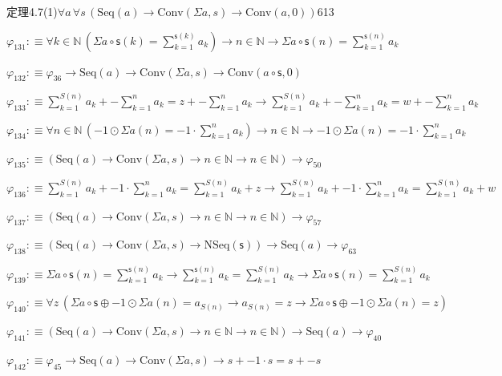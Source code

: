 \begin{fullproof}{定理4.7(1)}{$\forall a\,\forall s\,(\mathrm{Seq}(a) \to \mathrm{Conv}(\Sigma a,s) \to \mathrm{Conv}(a,0))$}{613}
\begin{abbrevlist}
\item $\varphi_{131} :\equiv \forall k \in \mathbb{N}\,(\Sigma a \circ \mathsf{s}(k) = {\textstyle\sum_{k=1}^{\mathsf{s}(k)} a_{k}}) \to n \in \mathbb{N} \to \Sigma a \circ \mathsf{s}(n) = {\textstyle\sum_{k=1}^{\mathsf{s}(n)} a_{k}}$
\item $\varphi_{132} :\equiv \varphi_{36} \to \mathrm{Seq}(a) \to \mathrm{Conv}(\Sigma a,s) \to \mathrm{Conv}(a \circ \mathsf{s},0)$
\item $\varphi_{133} :\equiv {\textstyle\sum_{k=1}^{S(n)} a_{k}} + -{\textstyle\sum_{k=1}^{n} a_{k}} = z + -{\textstyle\sum_{k=1}^{n} a_{k}} \to {\textstyle\sum_{k=1}^{S(n)} a_{k}} + -{\textstyle\sum_{k=1}^{n} a_{k}} = w + -{\textstyle\sum_{k=1}^{n} a_{k}}$
\item $\varphi_{134} :\equiv \forall n \in \mathbb{N}\,(-1 \odot \Sigma a(n) = -1 \cdot {\textstyle\sum_{k=1}^{n} a_{k}}) \to n \in \mathbb{N} \to -1 \odot \Sigma a(n) = -1 \cdot {\textstyle\sum_{k=1}^{n} a_{k}}$
\item $\varphi_{135} :\equiv (\mathrm{Seq}(a) \to \mathrm{Conv}(\Sigma a,s) \to n \in \mathbb{N} \to n \in \mathbb{N}) \to \varphi_{50}$
\item $\varphi_{136} :\equiv {\textstyle\sum_{k=1}^{S(n)} a_{k}} + -1 \cdot {\textstyle\sum_{k=1}^{n} a_{k}} = {\textstyle\sum_{k=1}^{S(n)} a_{k}} + z \to {\textstyle\sum_{k=1}^{S(n)} a_{k}} + -1 \cdot {\textstyle\sum_{k=1}^{n} a_{k}} = {\textstyle\sum_{k=1}^{S(n)} a_{k}} + w$
\item $\varphi_{137} :\equiv (\mathrm{Seq}(a) \to \mathrm{Conv}(\Sigma a,s) \to n \in \mathbb{N} \to n \in \mathbb{N}) \to \varphi_{57}$
\item $\varphi_{138} :\equiv (\mathrm{Seq}(a) \to \mathrm{Conv}(\Sigma a,s) \to \mathrm{NSeq}(\mathsf{s})) \to \mathrm{Seq}(a) \to \varphi_{63}$
\item $\varphi_{139} :\equiv \Sigma a \circ \mathsf{s}(n) = {\textstyle\sum_{k=1}^{\mathsf{s}(n)} a_{k}} \to {\textstyle\sum_{k=1}^{\mathsf{s}(n)} a_{k}} = {\textstyle\sum_{k=1}^{S(n)} a_{k}} \to \Sigma a \circ \mathsf{s}(n) = {\textstyle\sum_{k=1}^{S(n)} a_{k}}$
\item $\varphi_{140} :\equiv \forall z\,(\Sigma a \circ \mathsf{s} \oplus -1 \odot \Sigma a(n) = a_{S(n)} \to a_{S(n)} = z \to \Sigma a \circ \mathsf{s} \oplus -1 \odot \Sigma a(n) = z)$
\item $\varphi_{141} :\equiv (\mathrm{Seq}(a) \to \mathrm{Conv}(\Sigma a,s) \to n \in \mathbb{N} \to n \in \mathbb{N}) \to \mathrm{Seq}(a) \to \varphi_{40}$
\item $\varphi_{142} :\equiv \varphi_{45} \to \mathrm{Seq}(a) \to \mathrm{Conv}(\Sigma a,s) \to s + -1 \cdot s = s + -s$

\end{abbrevlist}
\end{fullproof}
